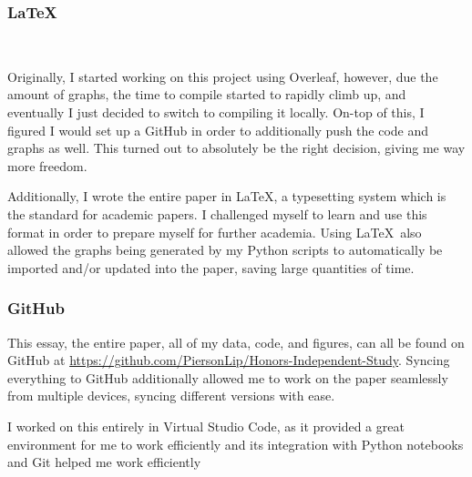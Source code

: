 \documentclass[12pt, a4paper]{article}
\begin{document}
        \subsubsection{\LaTeX}~\label{LaTeX}
        
            Originally, I started working on this project using Overleaf, however, due the amount of graphs, the time to compile started to rapidly climb up, and eventually I just decided to switch to compiling it locally. On-top of this, I figured I would set up a GitHub in order to additionally push the code and graphs as well. This turned out to absolutely be the right decision, giving me way more freedom.

            Additionally, I wrote the entire paper in \LaTeX, a typesetting system which is the standard for academic papers. I challenged myself to learn and use this format in order to prepare myself for further academia. Using \LaTeX~also allowed the graphs being generated by my Python scripts to automatically be imported and/or updated into the paper, saving large quantities of time.

        \subsubsection{GitHub}\label{GitHub}
            This essay, the entire paper, all of my data, code, and figures, can all be found on GitHub at \url{https://github.com/PiersonLip/Honors-Independent-Study}. Syncing everything to GitHub additionally allowed me to work on the paper seamlessly from multiple devices, syncing different versions with ease. 

            I worked on this entirely in Virtual Studio Code, as it provided a great environment for me to work efficiently and its integration with Python notebooks and Git helped me work efficiently

    \pagebreak
\printbibliography[
heading=bibintoc,
title={\centering Works Cited}
]
\end{document}
